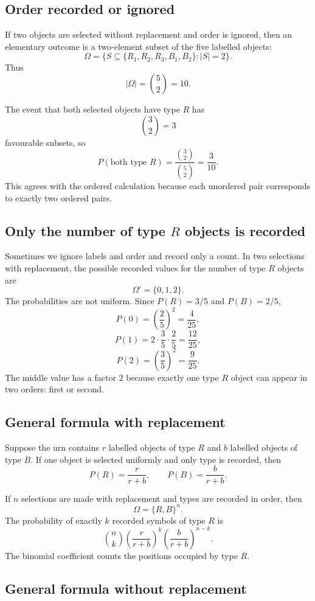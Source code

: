 \subsection*{Order recorded or ignored}

If two objects are selected without replacement and order is ignored, then an
elementary outcome is a two-element subset of the five labelled objects:
\[
\Omega=\{S\subseteq\{R_1,R_2,R_3,B_1,B_2\}: |S|=2\}.
\]
Thus
\[
|\Omega|=\binom52=10.
\]

The event that both selected objects have type \(R\) has
\[
\binom32=3
\]
favourable subsets, so
\[
P(\text{both type }R)=\frac{\binom32}{\binom52}=\frac3{10}.
\]
This agrees with the ordered calculation because each unordered pair corresponds
to exactly two ordered pairs.

\subsection*{Only the number of type \(R\) objects is recorded}

Sometimes we ignore labels and order and record only a count. In two selections
with replacement, the possible recorded values for the number of type \(R\)
objects are
\[
\Omega'=\{0,1,2\}.
\]
The probabilities are not uniform. Since \(P(R)=3/5\) and \(P(B)=2/5\),
\[
P(0)=\left(\frac25\right)^2=\frac4{25},
\]
\[
P(1)=2\cdot\frac35\cdot\frac25=\frac{12}{25},
\]
\[
P(2)=\left(\frac35\right)^2=\frac9{25}.
\]
The middle value has a factor \(2\) because exactly one type \(R\) object can
appear in two orders: first or second.

\subsection*{General formula with replacement}

Suppose the urn contains \(r\) labelled objects of type \(R\) and \(b\) labelled
objects of type \(B\). If one object is selected uniformly and only type is
recorded, then
\[
P(R)=\frac{r}{r+b},\qquad P(B)=\frac{b}{r+b}.
\]

If \(n\) selections are made with replacement and types are recorded in order,
then
\[
\Omega=\{R,B\}^n.
\]
The probability of exactly \(k\) recorded symbols of type \(R\) is
\[
\binom nk
\left(\frac{r}{r+b}\right)^k
\left(\frac{b}{r+b}\right)^{n-k}.
\]
The binomial coefficient counts the positions occupied by type \(R\).

\subsection*{General formula without replacement}

